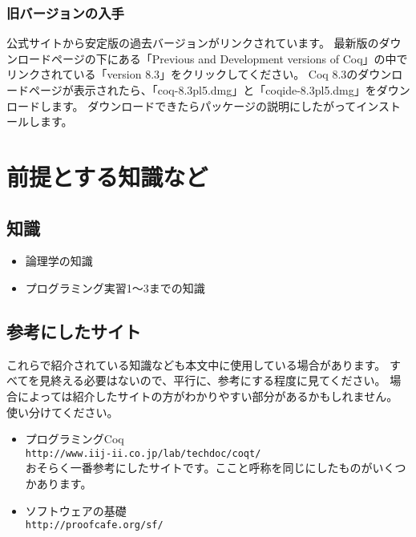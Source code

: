 \documentclass{jsbook}
\begin{document}
\subsubsection*{旧バージョンの入手}
公式サイトから安定版の過去バージョンがリンクされています。
最新版のダウンロードページの下にある「Previous and Development versions of Coq」の中でリンクされている「version 8.3」をクリックしてください。
Coq 8.3のダウンロードページが表示されたら、「coq-8.3pl5.dmg」と「coqide-8.3pl5.dmg」をダウンロードします。
ダウンロードできたらパッケージの説明にしたがってインストールします。

\newpage
\section{前提とする知識など}
\subsection*{知識}
\begin{itemize}
\item 論理学の知識
\item プログラミング実習1～3までの知識
\end{itemize}

\subsection*{参考にしたサイト}
これらで紹介されている知識なども本文中に使用している場合があります。
すべてを見終える必要はないので、平行に、参考にする程度に見てください。
場合によっては紹介したサイトの方がわかりやすい部分があるかもしれません。
使い分けてください。
\begin{itemize}
\item プログラミングCoq\\
\verb|http://www.iij-ii.co.jp/lab/techdoc/coqt/|\\
おそらく一番参考にしたサイトです。ここと呼称を同じにしたものがいくつかあります。
\item ソフトウェアの基礎\\
\verb|http://proofcafe.org/sf/|
\end{itemize}
\end{document}
